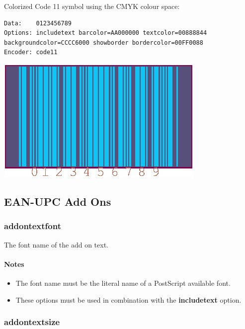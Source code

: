 Colorized Code 11 symbol using the CMYK colour space:

\begin{verbatim}
Data:    0123456789
Options: includetext barcolor=AA000000 textcolor=00888844 backgroundcolor=CCCC6000 showborder bordercolor=00FF0088
Encoder: code11
\end{verbatim}

\includegraphics{images/optcolorcmyk.eps}

\hypertarget{ean-upc-add-ons}{%
\subsection{EAN-UPC Add Ons}\label{ean-upc-add-ons}}

\hypertarget{addontextfont}{%
\subsubsection{addontextfont}\label{addontextfont}}

The font name of the add on text.

\hypertarget{notes-6}{%
\paragraph{Notes}\label{notes-6}}

\begin{itemize}
\tightlist
\item
  The font name must be the literal name of a PostScript available font.
\item
  These options must be used in combination with the
  \textbf{includetext} option.
\end{itemize}

\hypertarget{addontextsize}{%
\subsubsection{addontextsize}\label{addontextsize}}

